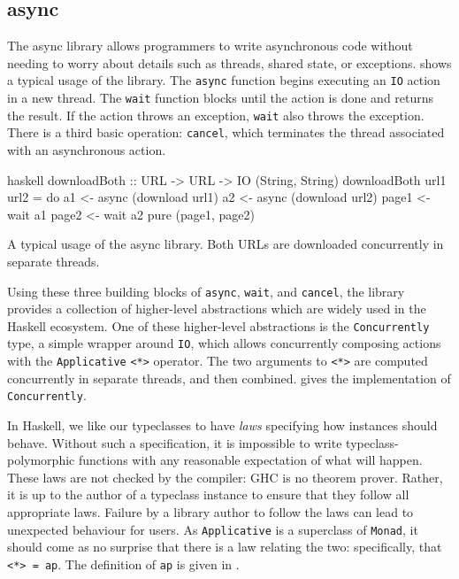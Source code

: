 \FloatBarrier

\subsection{async}
\label{sec:dejafu-casestudies-async}

The async library\cite{async} allows programmers to write asynchronous
code without needing to worry about details such as threads, shared
state, or exceptions.   shows a typical usage
of the library.  The \verb|async| function begins executing an
\verb|IO| action in a new thread.  The \verb|wait| function blocks
until the action is done and returns the result.  If the action throws
an exception, \verb|wait| also throws the exception.  There is a third
basic operation: \verb|cancel|, which terminates the thread associated
with an asynchronous action.

\begin{listing}
\centering
\begin{cminted}{haskell}
downloadBoth :: URL -> URL -> IO (String, String)
downloadBoth url1 url2 = do
  a1 <- async (download url1)
  a2 <- async (download url2)
  page1 <- wait a1
  page2 <- wait a2
  pure (page1, page2)
\end{cminted}
\caption[A typical usage of the async library.]{A typical usage of the async library.  Both URLs are downloaded concurrently in separate threads.}\label{lst:async_example}
\end{listing}

Using these three building blocks of \verb|async|, \verb|wait|, and
\verb|cancel|, the library provides a collection of higher-level
abstractions which are widely used in the Haskell ecosystem.  One of
these higher-level abstractions is the \verb|Concurrently| type, a
simple wrapper around \verb|IO|, which allows concurrently composing
actions with the \verb|Applicative| \verb|<*>| operator.  The two
arguments to \verb|<*>| are computed concurrently in separate threads,
and then combined.   gives the implementation
of \verb|Concurrently|.

In Haskell, we like our typeclasses to have \emph{laws} specifying how
instances should behave.  Without such a specification, it is
impossible to write typeclass-polymorphic functions with any
reasonable expectation of what will happen.  These laws are not
checked by the compiler: GHC is no theorem prover.  Rather, it is up
to the author of a typeclass instance to ensure that they follow all
appropriate laws.  Failure by a library author to follow the laws can
lead to unexpected behaviour for users.  As \verb|Applicative| is a
superclass of \verb|Monad|, it should come as no surprise that there
is a law relating the two: specifically, that \verb|<*> = ap|.  The
definition of \verb|ap| is given in .

